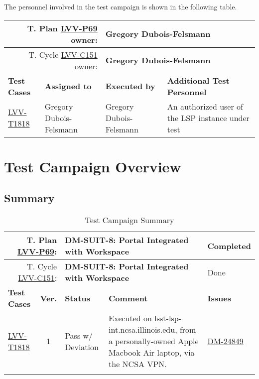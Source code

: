 \documentclass[DM,lsstdraft,STR,toc]{lsstdoc}
\begin{document}
The personnel involved in the test campaign is shown in the following table.

{\small
\begin{longtable}{p{3cm}p{3cm}p{3cm}p{6cm}}
\hline
\multicolumn{2}{r}{T. Plan \href{https://jira.lsstcorp.org/secure/Tests.jspa\#/testPlan/LVV-P69}{LVV-P69} owner:} &
\multicolumn{2}{l}{\textbf{ Gregory Dubois-Felsmann } }\\\hline
\multicolumn{2}{r}{T. Cycle \href{https://jira.lsstcorp.org/secure/Tests.jspa\#/testCycle/LVV-C151}{LVV-C151} owner:} &
\multicolumn{2}{l}{\textbf{
Gregory Dubois-Felsmann}
} \\\hline
\textbf{Test Cases} & \textbf{Assigned to} & \textbf{Executed by} & \textbf{Additional Test Personnel} \\ \hline
\href{https://jira.lsstcorp.org/secure/Tests.jspa#/testCase/LVV-T1818}{LVV-T1818}
& {\small Gregory Dubois-Felsmann } & {\small Gregory Dubois-Felsmann } &
\begin{minipage}[]{6cm}
\smallskip
{\small An authorized user of the LSP instance under test }
\medskip
\end{minipage}
\\ \hline
\end{longtable}
}

\newpage

\section{Test Campaign Overview}
\label{sect:overview}

\subsection{Summary}
\label{sect:summarytable}

{\small
\begin{longtable}{p{2cm}cp{2.3cm}p{8.6cm}p{2.3cm}}
\toprule
\multicolumn{2}{r}{ T. Plan \href{https://jira.lsstcorp.org/secure/Tests.jspa\#/testPlan/LVV-P69}{LVV-P69}:} &
\multicolumn{2}{p{10.9cm}}{\textbf{ DM-SUIT-8: Portal Integrated with Workspace }} & Completed \\\hline
\multicolumn{2}{r}{ T. Cycle \href{https://jira.lsstcorp.org/secure/Tests.jspa\#/testCycle/LVV-C151}{LVV-C151}:} &
\multicolumn{2}{p{10.9cm}}{\textbf{ DM-SUIT-8: Portal Integrated with Workspace }} & Done \\\hline
\textbf{Test Cases} &  \textbf{Ver.} & \textbf{Status} & \textbf{Comment} & \textbf{Issues} \\\toprule
\href{https://jira.lsstcorp.org/secure/Tests.jspa#/testCase/LVV-T1818}{LVV-T1818}
&  1
& Pass w/ Deviation &
\begin{minipage}[]{9cm}
\smallskip
Executed on lsst-lsp-int.ncsa.illinois.edu, from a personally-owned
Apple Macbook Air laptop, via the NCSA VPN.
\medskip
\end{minipage}
&
\href{https://jira.lsstcorp.org/browse/DM-24849}{DM-24849}
\\\hline
\caption{Test Campaign Summary}
\label{table:summary}
\end{longtable}
}
\end{document}
